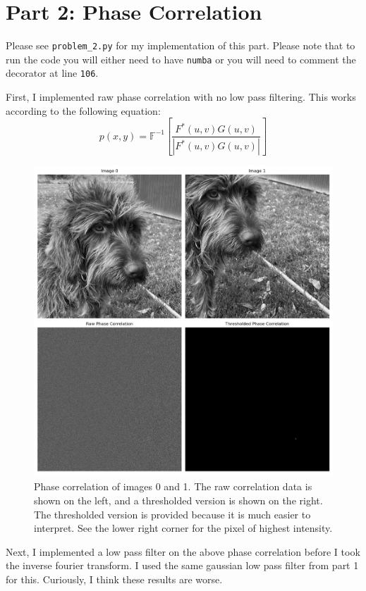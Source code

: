 \documentclass[]{article}
\begin{document}
\newpage
	\section{Part 2: Phase Correlation}
	Please see \texttt{problem\_2.py} for my implementation of this part. Please note that to run the code you will either need to have \texttt{numba} or you will need to comment the decorator at line \texttt{106}. 
	
	First, I implemented raw phase correlation with no low pass filtering. This works according to the following equation:
	\[p(x, y)=\mathbb{F}^{-1}\left[\frac{F^{*}(u, v) G(u, v)}{\left|F^{*}(u, v) G(u, v)\right|}\right]\]
	
	\begin{figure}[H]
		\centering
		\includegraphics[width=6.5in]{p2_output/phase_correlation_raw.png}
		\caption{Phase correlation of images 0 and 1. The raw correlation data is shown on the left, and a thresholded version is shown on the right. The thresholded version is provided because it is much easier to interpret. See the lower right corner for the pixel of highest intensity.}
	\end{figure}
	\newpage
Next, I implemented a low pass filter on the above phase correlation before I took the inverse fourier transform. I used the same gaussian low pass filter from part 1 for this. Curiously, I think these results are worse.
\end{document}
